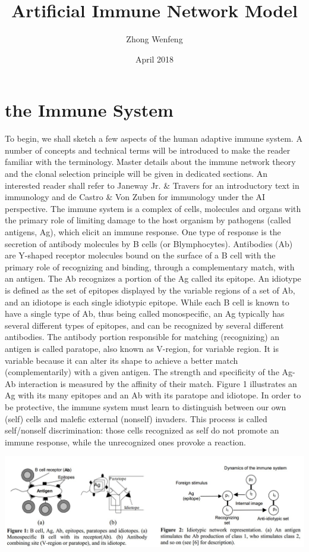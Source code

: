 \documentclass{article}
\title{Artificial Immune Network Model}
\author{Zhong Wenfeng \quad 21721234}
\date{April 2018}
\begin{document}
\maketitle

\section{the Immune System}
To begin, we shall sketch a few aspects of the human adaptive immune system. A number of concepts and technical terms will be introduced to make the reader familiar with the terminology. Master details about the immune network theory and the clonal selection principle will be given in dedicated sections. An interested reader shall refer to Janeway Jr. & Travers for an introductory text in immunology and de Castro & Von Zuben for immunology under the AI perspective. The immune system is a complex of cells, molecules and organs with the primary role of limiting damage to the host organism by pathogens (called antigens, Ag), which elicit an immune response. One type of response is the secretion of antibody molecules by B cells (or Blymphocytes). Antibodies (Ab) are Y-shaped receptor molecules bound on the surface of a B cell with the primary role of recognizing and binding, through a complementary match, with an antigen. The Ab recognizes a portion of the Ag called its epitope. An idiotype is defined as the set of epitopes displayed by the variable regions of a set of Ab, and an idiotope is each single idiotypic epitope. While each B cell is known to have a single type of Ab, thus being called monospecific, an Ag typically has several different types of epitopes, and can be recognized by several different antibodies. The antibody portion responsible for matching (recognizing) an antigen is called paratope, also known as V-region, for variable region. It is variable because it can alter its shape to achieve a better match (complementarily) with a given antigen. The strength and specificity of the Ag-Ab interaction is measured by the affinity of their match. Figure 1 illustrates an Ag with its many epitopes and an Ab with its paratope and idiotope. In order to be protective, the immune system must learn to distinguish between our own (self) cells and malefic external (nonself) invaders. This process is called self/nonself discrimination: those cells recognized as self do not promote an immune response, while the unrecognized ones provoke a reaction.
\begin{center} 
\includegraphics[width = .8\textwidth]{images/Figure_1&2.jpg}
\end{center} 
\end{document}
